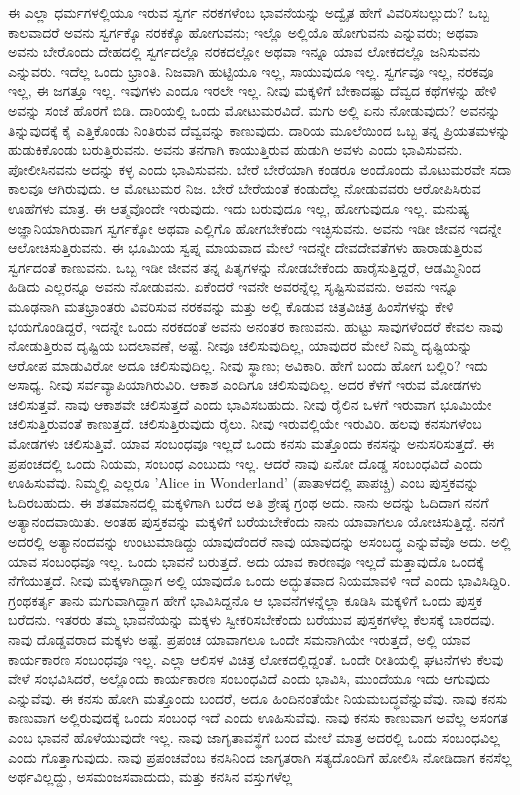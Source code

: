 ಈ ಎಲ್ಲಾ ಧರ್ಮಗಳಲ್ಲಿಯೂ ಇರುವ ಸ್ವರ್ಗ ನರಕಗಳೆಂಬ ಭಾವನೆಯನ್ನು ಅದ್ವೈತ ಹೇಗೆ ವಿವರಿಸಬಲ್ಲುದು? ಒಬ್ಬ ಕಾಲವಾದರೆ ಅವನು ಸ್ವರ್ಗಕ್ಕೊ ನರಕಕ್ಕೊ ಹೋಗುವನು; ಇಲ್ಲೊ ಅಲ್ಲಿಯೊ ಹೋಗುವನು ಎನ್ನುವರು; ಅಥವಾ ಅವನು ಬೇರೊಂದು ದೇಹದಲ್ಲಿ ಸ್ವರ್ಗದಲ್ಲೊ ನರಕದಲ್ಲೋ ಅಥವಾ ಇನ್ನೂ ಯಾವ ಲೋಕದಲ್ಲೊ ಜನಿಸುವನು ಎನ್ನುವರು. ಇದೆಲ್ಲ ಒಂದು ಭ್ರಾಂತಿ. ನಿಜವಾಗಿ ಹುಟ್ಟಿಯೂ ಇಲ್ಲ, ಸಾಯುವುದೂ ಇಲ್ಲ. ಸ್ವರ್ಗವೂ ಇಲ್ಲ, ನರಕವೂ ಇಲ್ಲ, ಈ ಜಗತ್ತೂ ಇಲ್ಲ. ಇವುಗಳು ಎಂದೂ ಇರಲೇ ಇಲ್ಲ. ನೀವು ಮಕ್ಕಳಿಗೆ ಬೇಕಾದಷ್ಟು ದೆವ್ವದ ಕಥೆಗಳನ್ನು ಹೇಳಿ ಅವನ್ನು ಸಂಜೆ ಹೊರಗೆ ಬಿಡಿ. ದಾರಿಯಲ್ಲಿ ಒಂದು ಮೋಟುಮರವಿದೆ. ಮಗು ಅಲ್ಲಿ ಏನು ನೋಡುವುದು? ಅವನನ್ನು ತಿನ್ನುವುದಕ್ಕೆ ಕೈ ಎತ್ತಿಕೊಂಡು ನಿಂತಿರುವ ದೆವ್ವವನ್ನು ಕಾಣುವುದು. ದಾರಿಯ ಮೂಲೆಯಿಂದ ಒಬ್ಬ ತನ್ನ ಪ್ರಿಯತಮಳನ್ನು ಹುಡುಕಿಕೊಂಡು ಬರುತ್ತಿರುವನು. ಅವನು ತನಗಾಗಿ ಕಾಯುತ್ತಿರುವ ಹುಡುಗಿ ಅವಳು ಎಂದು ಭಾವಿಸುವನು. ಪೋಲೀಸಿನವನು ಅದನ್ನು ಕಳ್ಳ ಎಂದು ಭಾವಿಸುವನು. ಬೇರೆ ಬೇರೆಯಾಗಿ ಕಂಡರೂ ಅಂದೊಂದು ಮೊಟುಮರವೇ ಸದಾ ಕಾಲವೂ ಆಗಿರುವುದು. ಆ ಮೋಟುಮರ ನಿಜ. ಬೇರೆ ಬೇರೆಯಂತೆ ಕಂಡುದೆಲ್ಲ ನೋಡುವವರು ಆರೋಪಿಸಿರುವ ಊಹೆಗಳು ಮಾತ್ರ. ಈ ಆತ್ಮವೊಂದೇ ಇರುವುದು. ಇದು ಬರುವುದೂ ಇಲ್ಲ, ಹೋಗುವುದೂ ಇಲ್ಲ. ಮನುಷ್ಯ ಅಜ್ಞಾನಿಯಾಗಿರುವಾಗ ಸ್ವರ್ಗಕ್ಕೋ ಅಥವಾ ಎಲ್ಲಿಗೊ ಹೋಗಬೇಕೆಂದು ಇಚ್ಛಿಸುವನು. ಅವನು ಇಡೀ ಜೀವನ ಇದನ್ನೇ ಆಲೋಚಿಸುತ್ತಿರುವನು. ಈ ಭೂಮಿಯ ಸ್ವಪ್ನ ಮಾಯವಾದ ಮೇಲೆ ಇದನ್ನೇ ದೇವದೇವತೆಗಳು ಹಾರಾಡುತ್ತಿರುವ ಸ್ವರ್ಗದಂತೆ ಕಾಣುವನು. ಒಬ್ಬ ಇಡೀ ಜೀವನ ತನ್ನ ಪಿತೃಗಳನ್ನು ನೋಡಬೇಕೆಂದು ಹಾರೈಸುತ್ತಿದ್ದರೆ, ಆಡಮ್ಮಿನಿಂದ ಹಿಡಿದು ಎಲ್ಲರನ್ನೂ ಅವನು ನೋಡುವನು. ಏಕೆಂದರೆ ಇವನೇ ಅವರನ್ನೆಲ್ಲ ಸೃಷ್ಟಿಸುವವನು. ಅವನು ಇನ್ನೂ ಮೂಢನಾಗಿ ಮತಭ್ರಾಂತರು ವಿವರಿಸುವ ನರಕವನ್ನು ಮತ್ತು ಅಲ್ಲಿ ಕೊಡುವ ಚಿತ್ರವಿಚಿತ್ರ ಹಿಂಸೆಗಳನ್ನು ಕೇಳಿ ಭಯಗೊಂಡಿದ್ದರೆ, ಇದನ್ನೇ ಒಂದು ನರಕದಂತೆ ಅವನು ಅನಂತರ ಕಾಣುವನು. ಹುಟ್ಟು ಸಾವುಗಳೆಂದರೆ ಕೇವಲ ನಾವು ನೋಡುತ್ತಿರುವ ದೃಷ್ಟಿಯ ಬದಲಾವಣೆ, ಅಷ್ಟೆ. ನೀವೂ ಚಲಿಸುವುದಿಲ್ಲ, ಯಾವುದರ ಮೇಲೆ ನಿಮ್ಮ ದೃಷ್ಟಿಯನ್ನು ಆರೋಪ ಮಾಡುವಿರೋ ಅದೂ ಚಲಿಸುವುದಿಲ್ಲ. ನೀವು ಸ್ಥಾಣು; ಅವಿಕಾರಿ. ಹೇಗೆ ಬಂದು ಹೋಗ ಬಲ್ಲಿರಿ? ಇದು ಅಸಾಧ್ಯ. ನೀವು ಸರ್ವವ್ಯಾಪಿಯಾಗಿರುವಿರಿ. ಆಕಾಶ ಎಂದಿಗೂ ಚಲಿಸುವುದಿಲ್ಲ. ಅದರ ಕೆಳಗೆ ಇರುವ ಮೋಡಗಳು ಚಲಿಸುತ್ತವೆ. ನಾವು ಆಕಾಶವೇ ಚಲಿಸುತ್ತದೆ ಎಂದು ಭಾವಿಸಬಹುದು. ನೀವು ರೈಲಿನ ಒಳಗೆ ಇರುವಾಗ ಭೂಮಿಯೇ ಚಲಿಸುತ್ತಿರುವಂತೆ ಕಾಣುತ್ತದೆ. ಚಲಿಸುತ್ತಿರುವುದು ರೈಲು. ನೀವು ಇರುವಲ್ಲಿಯೇ ಇರುವಿರಿ. ಹಲವು ಕನಸುಗಳೆಂಬ ಮೋಡಗಳು ಚಲಿಸುತ್ತಿವೆ. ಯಾವ ಸಂಬಂಧವೂ ಇಲ್ಲದೆ ಒಂದು ಕನಸು ಮತ್ತೊಂದು ಕನಸನ್ನು ಅನುಸರಿಸುತ್ತದೆ. ಈ ಪ್ರಪಂಚದಲ್ಲಿ ಒಂದು ನಿಯಮ, ಸಂಬಂಧ ಎಂಬುದು ಇಲ್ಲ. ಆದರೆ ನಾವು ಏನೋ ದೊಡ್ಡ ಸಂಬಂಧವಿದೆ ಎಂದು ಊಹಿಸುವೆವು. ನಿಮ್ಮಲ್ಲಿ ಎಲ್ಲರೂ 'Alice in Wonderland' (ಪಾತಾಳದಲ್ಲಿ ಪಾಪಚ್ಚಿ) ಎಂಬ ಪುಸ್ತಕವನ್ನು ಓದಿರಬಹುದು. ಈ ಶತಮಾನದಲ್ಲಿ ಮಕ್ಕಳಿಗಾಗಿ ಬರೆದ ಅತಿ ಶ್ರೇಷ್ಠ ಗ್ರಂಥ ಅದು. ನಾನು ಅದನ್ನು ಓದಿದಾಗ ನನಗೆ ಅತ್ಯಾನಂದವಾಯಿತು. ಅಂತಹ ಪುಸ್ತಕವನ್ನು ಮಕ್ಕಳಿಗೆ ಬರೆಯಬೇಕೆಂದು ನಾನು ಯಾವಾಗಲೂ ಯೋಚಿಸುತ್ತಿದ್ದೆ. ನನಗೆ ಅದರಲ್ಲಿ ಅತ್ಯಾನಂದವನ್ನು ಉಂಟುಮಾಡಿದ್ದು ಯಾವುದೆಂದರೆ ನಾವು ಯಾವುದನ್ನು ಅಸಂಬದ್ಧ ಎನ್ನುವೆವೊ ಅದು. ಅಲ್ಲಿ ಯಾವ ಸಂಬಂಧವೂ ಇಲ್ಲ. ಒಂದು ಭಾವನೆ ಬರುತ್ತದೆ. ಅದು ಯಾವ ಕಾರಣವೂ ಇಲ್ಲದೆ ಮತ್ತಾವುದೊ ಒಂದಕ್ಕೆ ನೆಗೆಯುತ್ತದೆ. ನೀವು ಮಕ್ಕಳಾಗಿದ್ದಾಗ ಅಲ್ಲಿ ಯಾವುದೊ ಒಂದು ಅದ್ಭುತವಾದ ನಿಯಮಾವಳಿ ಇದೆ ಎಂದು ಭಾವಿಸಿದ್ದಿರಿ. ಗ್ರಂಥಕರ್ತೃ ತಾನು ಮಗುವಾಗಿದ್ದಾಗ ಹೇಗೆ ಭಾವಿಸಿದ್ದನೊ ಆ ಭಾವನೆಗಳನ್ನೆಲ್ಲಾ ಕೂಡಿಸಿ ಮಕ್ಕಳಿಗೆ ಒಂದು ಪುಸ್ತಕ ಬರೆದನು. ಇತರರು ತಮ್ಮ ಭಾವನೆಯನ್ನು ಮಕ್ಕಳು ಸ್ವೀಕರಿಸಬೇಕೆಂದು ಬರೆಯುವ ಪುಸ್ತಕಗಳೆಲ್ಲ ಕೆಲಸಕ್ಕೆ ಬಾರದವು. ನಾವು ದೊಡ್ಡವರಾದ ಮಕ್ಕಳು ಅಷ್ಟೆ. ಪ್ರಪಂಚ ಯಾವಾಗಲೂ ಒಂದೇ ಸಮನಾಗಿಯೇ ಇರುತ್ತದೆ, ಅಲ್ಲಿ ಯಾವ ಕಾರ್ಯಕಾರಣ ಸಂಬಂಧವೂ ಇಲ್ಲ. ಎಲ್ಲಾ ಆಲಿಸಳ ವಿಚಿತ್ರ ಲೋಕದಲ್ಲಿದ್ದಂತೆ. ಒಂದೇ ರೀತಿಯಲ್ಲಿ ಘಟನೆಗಳು ಕೆಲವು ವೇಳೆ ಸಂಭವಿಸಿದರೆ, ಅಲ್ಲೊಂದು ಕಾರ್ಯಕಾರಣ ಸಂಬಂಧವಿದೆ ಎಂದು ಭಾವಿಸಿ, ಮುಂದೆಯೂ ಇದು ಆಗುವುದು ಎನ್ನುವೆವು. ಈ ಕನಸು ಹೋಗಿ ಮತ್ತೊಂದು ಬಂದರೆ, ಅದೂ ಹಿಂದಿನಂತೆಯೇ ನಿಯಮಬದ್ಧವೆನ್ನುವೆವು. ನಾವು ಕನಸು ಕಾಣುವಾಗ ಅಲ್ಲಿರುವುದಕ್ಕೆ ಒಂದು ಸಂಬಂಧ ಇದೆ ಎಂದು ಊಹಿಸುವೆವು. ನಾವು ಕನಸು ಕಾಣುವಾಗ ಅವೆಲ್ಲ ಅಸಂಗತ ಎಂಬ ಭಾವನೆ ಹೊಳೆಯುವುದೇ ಇಲ್ಲ. ನಾವು ಜಾಗೃತಾವಸ್ಥೆಗೆ ಬಂದ ಮೇಲೆ ಮಾತ್ರ ಅದರಲ್ಲಿ ಒಂದು ಸಂಬಂಧವಿಲ್ಲ ಎಂದು ಗೊತ್ತಾಗುವುದು. ನಾವು ಪ್ರಪಂಚವೆಂಬ ಕನಸಿನಿಂದ ಜಾಗೃತರಾಗಿ ಸತ್ಯದೊಂದಿಗೆ ಹೋಲಿಸಿ ನೋಡಿದಾಗ ಕನಸೆಲ್ಲ ಅರ್ಥವಿಲ್ಲದ್ದು, ಅಸಮಂಜಸವಾದುದು, ಮತ್ತು ಕನಸಿನ ವಸ್ತುಗಳೆಲ್ಲ 